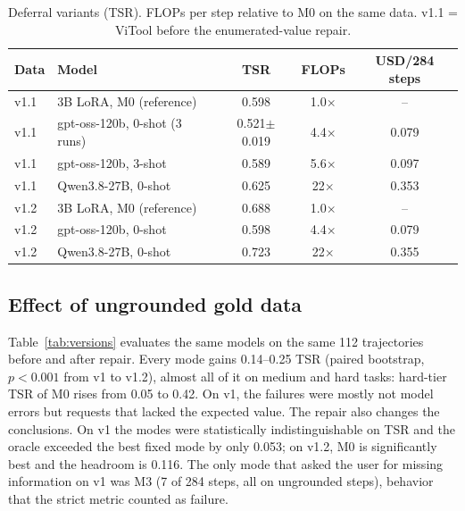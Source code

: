 \documentclass[conference,a4paper]{IEEEtran}
\newcommand{\QwenVtwo}{0.723} %
\begin{document}
\begin{table}[t]
\caption{Deferral variants (TSR). FLOPs per step relative to M0 on the same
data. v1.1 = ViTool before the enumerated-value repair.}
\label{tab:defer}
\centering
\footnotesize
\setlength{\tabcolsep}{4pt}
\begin{tabular}{llccc}
\toprule
Data & Model & TSR & FLOPs & USD/284 steps \\
\midrule
v1.1 & 3B LoRA, M0 (reference) & 0.598 & 1.0$\times$ & -- \\
v1.1 & gpt-oss-120b, 0-shot (3 runs) & 0.521$\pm$0.019 & 4.4$\times$ & 0.079 \\
v1.1 & gpt-oss-120b, 3-shot & 0.589 & 5.6$\times$ & 0.097 \\
v1.1 & Qwen3.8-27B, 0-shot & 0.625 & 22$\times$ & 0.353 \\
\midrule
v1.2 & 3B LoRA, M0 (reference) & 0.688 & 1.0$\times$ & -- \\
v1.2 & gpt-oss-120b, 0-shot & 0.598 & 4.4$\times$ & 0.079 \\
v1.2 & Qwen3.8-27B, 0-shot & \QwenVtwo & 22$\times$ & 0.355 \\
\bottomrule
\end{tabular}
\end{table}

\subsection{Effect of ungrounded gold data}
Table~\ref{tab:versions} evaluates the same models on the same 112
trajectories before and after repair. Every mode gains 0.14--0.25 TSR
(paired bootstrap, $p<0.001$ from v1 to v1.2), almost all of it on medium and
hard tasks: hard-tier TSR of M0 rises from 0.05 to 0.42. On v1, the failures
were mostly not model errors but requests that lacked the expected value. The
repair also changes the conclusions. On v1 the modes were statistically
indistinguishable on TSR and the oracle exceeded the best fixed mode by only
0.053; on v1.2, M0 is significantly best and the headroom is 0.116. The only
mode that asked the user for missing information on v1 was M3 (7 of 284 steps,
all on ungrounded steps), behavior that the strict metric counted as failure.
\end{document}
